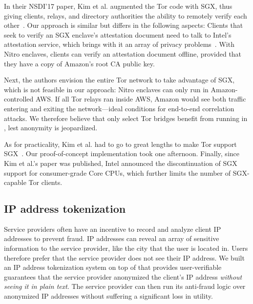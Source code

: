In their NSDI'17 paper, Kim et al. augmented the Tor code with SGX, thus giving
clients, relays, and directory authorities the ability to remotely verify each
other~\cite{Kim2017a}.  Our approach is similar but differs in the following
aspects:
%
Clients that seek to verify an SGX enclave's attestation document need to talk
to Intel's attestation service, which brings with it an array of privacy
problems~\cite[\S~1.2]{Chen2019a}.  With Nitro enclaves, clients can verify an
attestation document offline, provided that they have a copy of Amazon's root CA
public key.

Next, the authors envision the entire Tor network to take advantage of SGX,
which is not feasible in our approach: Nitro enclaves can only run in
Amazon-controlled AWS.  If all Tor relays ran inside AWS, Amazon would see both
traffic entering and exiting the network---ideal conditions for end-to-end
correlation attacks.  We therefore believe that only select Tor bridges benefit
from running in \tool{}, lest anonymity is jeopardized.

As for practicality, Kim et al. had to go to great lengths to make Tor support
SGX~\cite[\S~5]{Kim2017a}.  Our proof-of-concept implementation took one
afternoon.  Finally, since Kim et al.'s paper was published, Intel announced the
discontinuation of SGX support for consumer-grade Core CPUs, which further
limits the number of SGX-capable Tor clients.


\subsection{IP address tokenization}
\label{sec:tokenization}

Service providers often have an incentive to record and analyze client IP
addresses to prevent fraud.  IP addresses can reveal an array of sensitive
information to the service provider, like the city that the user is located in.
Users therefore prefer that the service provider does not see their IP address.
We built an IP address tokenization system on top of \tool{} that provides
user-verifiable guarantees that the service provider anonymized the client's IP
address \emph{without seeing it in plain text}.  The service provider can then
run its anti-fraud logic over anonymized IP addresses without suffering a
significant loss in utility.


